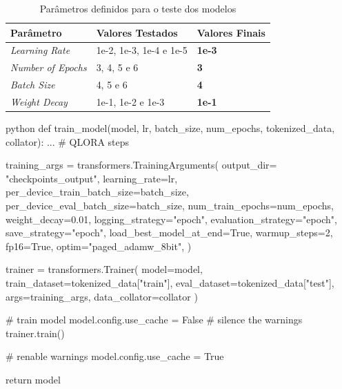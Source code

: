 \begin{table}[ht]
    \centering
    \caption{Parâmetros definidos para o teste dos modelos}
    \begin{tabular}{|l|l|l|}
    \hline
         \textbf{Parâmetro} & \textbf{Valores Testados} & \textbf{Valores Finais} \\ \hline
         \textit{Learning Rate} & 1e-2, 1e-3, 1e-4 e 1e-5 & \textbf{1e-3} \\ \hline
         \textit{Number of Epochs} & 3, 4, 5 e 6 & \textbf{3} \\ \hline
         \textit{Batch Size} & 4, 5 e 6 & \textbf{4} \\ \hline
         \textit{Weight Decay} & 1e-1, 1e-2 e 1e-3 & \textbf{1e-1} \\ \hline
    \end{tabular}
    \label{tab:params}
\end{table}

\begin{code}
    \label{f:model}
    \begin{mintedbox}{python}
    def train_model(model, lr, batch_size, num_epochs, tokenized_data, collator):
        ... # QLORA steps
        
        training_args = transformers.TrainingArguments(
            output_dir= "checkpoints_output",
            learning_rate=lr,
            per_device_train_batch_size=batch_size,
            per_device_eval_batch_size=batch_size,
            num_train_epochs=num_epochs,
            weight_decay=0.01,
            logging_strategy="epoch",
            evaluation_strategy="epoch",
            save_strategy="epoch",
            load_best_model_at_end=True,
            warmup_steps=2,
            fp16=True,
            optim="paged_adamw_8bit",
        )
    
        trainer = transformers.Trainer(
            model=model,
            train_dataset=tokenized_data["train"],
            eval_dataset=tokenized_data["test"],
            args=training_args,
            data_collator=collator
        )
    
        # train model
        model.config.use_cache = False  # silence the warnings
        trainer.train()
    
        # renable warnings
        model.config.use_cache = True
    
        return model
\end{mintedbox}
\end{code}

